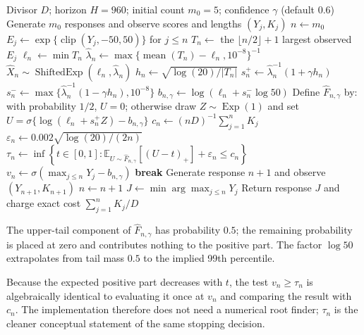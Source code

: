 \begin{algorithm}[H]
\caption{Alignment: training-free adaptive stopping rule}
\label{alg:alignment}
\footnotesize
\begin{algorithmic}[1]
\Require Divisor $D$; horizon $H=960$; initial count $m_0=5$;
confidence $\gamma$ (default $0.6$)
\State Generate $m_0$ responses and observe scores and lengths $(Y_j,K_j)$
\State $n\gets m_0$
  \State $E_j\gets\exp\{\operatorname{clip}(Y_j,-50,50)\}$ for $j\le n$
  \State $T_n\gets$ the $\lfloor n/2\rfloor+1$ largest observed $E_j$
  \State $\ell_n\gets\min T_n$ 
  \State $\widehat\lambda_n\gets
         \max\{\operatorname{mean}(T_n)-\ell_n,10^{-8}\}^{-1}$
  \State $\widehat X_n\sim
         \operatorname{ShiftedExp}(\ell_n,\widehat\lambda_n)$
  \State $h_n\gets\sqrt{\log(20)/|T_n|}$
  \State $s_n^+\gets\widehat\lambda_n^{-1}(1+\gamma h_n)$
  \State $s_n^-\gets
         \max\{\widehat\lambda_n^{-1}(1-\gamma h_n),10^{-8}\}$
  \State $b_{n,\gamma}\gets\log(\ell_n+s_n^-\log 50)$
  \State Define $\widehat F_{n,\gamma}$ by: with probability $1/2$, $U=0$;
         otherwise draw $Z\sim\operatorname{Exp}(1)$ and set
         $U=\sigma\{\log(\ell_n+s_n^+Z)-b_{n,\gamma}\}$
  \State $c_n\gets (nD)^{-1}\sum_{j=1}^{n}K_j$
  \State $\varepsilon_n\gets0.002\sqrt{\log(20)/(2n)}$
  \State $\displaystyle \tau_n\gets\inf\left\{t\in[0,1]:
         \mathbb E_{U\sim\widehat F_{n,\gamma}}[(U-t)_+]
         +\varepsilon_n\le c_n\right\}$
  \State $v_n\gets\sigma(\max_{j\le n}Y_j-b_{n,\gamma})$
    \State \textbf{break} 
  \EndIf
  \State Generate response $n+1$ and observe $(Y_{n+1},K_{n+1})$
  \State $n\gets n+1$
\EndWhile
\State $J\gets\min\arg\max_{j\le n}Y_j$
\State Return response $J$ and charge exact cost $\sum_{j=1}^{n}K_j/D$
\end{algorithmic}
\end{algorithm}

The upper-tail component of $\widehat F_{n,\gamma}$ has probability $0.5$;
the remaining probability is placed at zero and contributes nothing to the
positive part.  The factor $\log 50$ extrapolates from tail mass $0.5$ to the
implied 99th percentile.

Because the expected positive part decreases with $t$, the test
$v_n\ge\tau_n$ is algebraically identical to evaluating it once at $v_n$ and
comparing the result with $c_n$.  The implementation therefore does not need
a numerical root finder; $\tau_n$ is the cleaner conceptual statement of the
same stopping decision.

